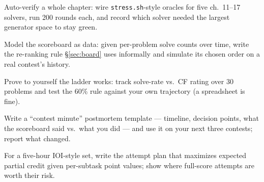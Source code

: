 \begin{exercise}[hard] Auto-verify a whole chapter: wire \texttt{stress.sh}-style oracles for five ch.~11--17 solvers, run 200 rounds each, and record which solver needed the largest generator space to stay green. \end{exercise}
\begin{exercise}[hard] Model the scoreboard as data: given per-problem solve counts over time, write the re-ranking rule \S\ref{sec:board} uses informally and simulate its chosen order on a real contest's history. \end{exercise}
\begin{exercise}[hard] Prove to yourself the ladder works: track solve-rate vs.\ CF rating over 30 problems and test the 60\% rule against your own trajectory (a spreadsheet is fine). \end{exercise}
\begin{exercise}[hard] Write a ``contest minute'' postmortem template --- timeline, decision points, what the scoreboard said vs.\ what you did --- and use it on your next three contests; report what changed. \end{exercise}
\begin{exercise}[hard] For a five-hour IOI-style set, write the attempt plan that maximizes expected partial credit given per-subtask point values; show where full-score attempts are worth their risk. \end{exercise}

\chapternotes

